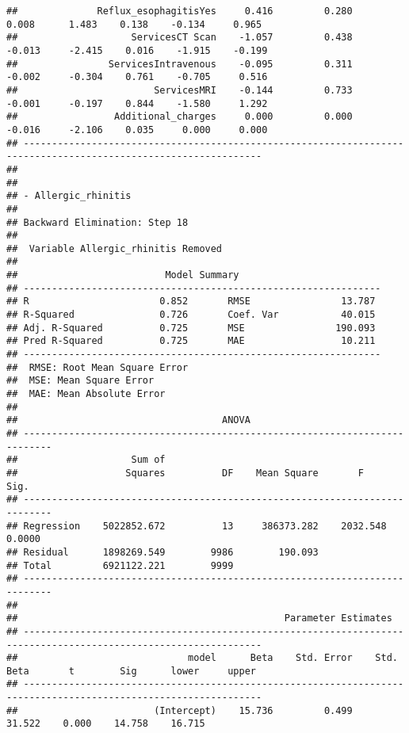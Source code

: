 \documentclass[
]{article}
\begin{document}
\begin{verbatim}
##              Reflux_esophagitisYes     0.416         0.280        0.008      1.483    0.138    -0.134     0.965 
##                    ServicesCT Scan    -1.057         0.438       -0.013     -2.415    0.016    -1.915    -0.199 
##                ServicesIntravenous    -0.095         0.311       -0.002     -0.304    0.761    -0.705     0.516 
##                        ServicesMRI    -0.144         0.733       -0.001     -0.197    0.844    -1.580     1.292 
##                 Additional_charges     0.000         0.000       -0.016     -2.106    0.035     0.000     0.000 
## ----------------------------------------------------------------------------------------------------------------
## 
## 
## - Allergic_rhinitis 
## 
## Backward Elimination: Step 18 
## 
##  Variable Allergic_rhinitis Removed 
## 
##                          Model Summary                          
## ---------------------------------------------------------------
## R                       0.852       RMSE                13.787 
## R-Squared               0.726       Coef. Var           40.015 
## Adj. R-Squared          0.725       MSE                190.093 
## Pred R-Squared          0.725       MAE                 10.211 
## ---------------------------------------------------------------
##  RMSE: Root Mean Square Error 
##  MSE: Mean Square Error 
##  MAE: Mean Absolute Error 
## 
##                                    ANOVA                                    
## ---------------------------------------------------------------------------
##                    Sum of                                                  
##                   Squares          DF    Mean Square       F          Sig. 
## ---------------------------------------------------------------------------
## Regression    5022852.672          13     386373.282    2032.548    0.0000 
## Residual      1898269.549        9986        190.093                       
## Total         6921122.221        9999                                      
## ---------------------------------------------------------------------------
## 
##                                               Parameter Estimates                                                
## ----------------------------------------------------------------------------------------------------------------
##                              model      Beta    Std. Error    Std. Beta       t        Sig      lower     upper 
## ----------------------------------------------------------------------------------------------------------------
##                        (Intercept)    15.736         0.499                  31.522    0.000    14.758    16.715 

\end{verbatim}
\end{document}

